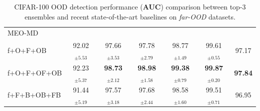 \begin{table}
{\begin{tabular}{|l|cccccc|}
MEO-MD & & & & & & \multicolumn{1}{|c|}{}  \\
f+O+F+OB     & 92.02$_{\pm 5.53}$ & 97.66$_{\pm 3.53}$ & 97.78$_{\pm 2.79}$ & 98.77$_{\pm 1.49}$ & 99.61$_{\pm 0.55}$ &  \multicolumn{1}{|c|}{97.17}    \\ 
f+O+F+OF+OB   & 92.23$_{\pm 5.37}$ & \textbf{98.73$_{\pm 2.12}$} & \textbf{98.98$_{\pm 1.58}$} & \textbf{99.38$_{\pm 0.79}$} & \textbf{99.87$_{\pm 0.20}$} &  \multicolumn{1}{|c|}{\textbf{97.84}}      \\ 
f+F+B+OB+FB  & 91.44$_{\pm 5.19}$ & 97.57$_{\pm 3.18}$ & 97.68$_{\pm 2.44}$ & 98.58$_{\pm 1.60}$ & 99.51$_{\pm 0.71}$ &  \multicolumn{1}{|c|}{96.95}   \\ \hline
\end{tabular}
}
\caption{CIFAR-100 OOD detection performance (\textbf{AUC}) comparison between top-3 \sysb ensembles and recent state-of-the-art baselines on \textit{far-OOD} datasets. %
}%
\label{tab:propwork-meo-results-cifar100-far}
\end{table}

